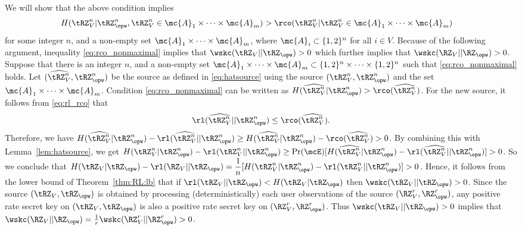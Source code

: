  
 We will show that the above condition implies 
  \begin{align} \label{eq:rco_nonmaximal}
     &H(\tRZ^n_V|\tRZ^n_{\opw},\tRZ^n_V\in \mc{A}_{1}\times\cdots\times\mc{A}_{m})
     > \rco(\tRZ^n_V|\tRZ^n_V\in \mc{A}_{1}\times\cdots\times\mc{A}_{m})
 \end{align}
 for some integer $n$, and a non-empty set $\mc{A}_{1}\times\cdots\times\mc{A}_{m}$, where $\mc{A}_{i} \subset \{1,2\}^n$ for all $i \in V$. Because of the following argument, inequality \eqref{eq:rco_nonmaximal} implies that $\wskc(\tRZ_V||\tRZ_{\opw})>0$ which further implies that $\wskc(\RZ_V||\RZ_{\opw})>0$. Suppose that there is an integer $n$, and a non-empty set $\mc{A}_{1}\times\cdots\times\mc{A}_{m}\subset \{1,2\}^n\times\cdots\times \{1,2\}^n$ such that \eqref{eq:rco_nonmaximal} holds. Let $(\widehat{\tRZ_V^n},\tRZ^n_{\opw})$ be the source as defined in \eqref{eq:hatsource} using the source $(\tRZ_V^n,\tRZ^n_{\opw})$ and the set $\mc{A}_{1}\times\cdots\times\mc{A}_{m}$.  Condition \eqref{eq:rco_nonmaximal} can be written as $H(\widehat{\tRZ_V^n}|\tRZ^n_{\opw})> \rco(\widehat{\tRZ_V^n})$. For the new source, it follows from \eqref{eq:rl_rco} that 
 \begin{align*}
     \rl(\widehat{\tRZ_V^n}||\tRZ^n_{\opw}) \leq \rco(\widehat{\tRZ_V^n}).
 \end{align*}
Therefore, we have  $H(\widehat{\tRZ_V^n}|\tRZ^n_{\opw})-\rl(\widehat{\tRZ_V^n}||\tRZ^n_{\opw}) \geq H(\widehat{\tRZ_V^n}|\tRZ^n_{\opw})- \rco(\widehat{\tRZ_V^n})>0$. By combining this with Lemma~\ref{lem:hatsource}, we get 
$H(\tRZ_V^n|\tRZ^n_{\opw})-\rl(\tRZ_V^n||\tRZ^n_{\opw}) \geq \Pr(\mcE) [H(\widehat{\tRZ_V^n}|\tRZ^n_{\opw})-\rl(\widehat{\tRZ_V^n}||\tRZ^n_{\opw})]>0$. So we conclude that $H(\tRZ_V|\tRZ_{\opw})-\rl(\RZ_V||\tRZ_{\opw})=\dfrac{1}{n}[H(\tRZ_V^n|\tRZ^n_{\opw})-\rl(\tRZ_V^n||\tRZ^n_{\opw})]>0$. Hence, it follows from the lower bound of Theorem~\ref{thm:RL:lb} that if $\rl(\tRZ_V||\tRZ_{\opw})< H(\tRZ_V|\tRZ_{\opw})$ then $\wskc(\tRZ_V||\tRZ_{\opw})>0$. Since the source $(\tRZ_V, \tRZ_{\opw})$ is obtained by processing (deterministically) each user observations of the source $(\RZ^r_V, \RZ^r_{\opw})$, any positive rate secret key on $(\tRZ_V, \tRZ_{\opw})$ is also a positive rate secret key on $(\RZ^r_V, \RZ^r_{\opw})$. Thus $\wskc(\tRZ_V||\tRZ_{\opw})>0$ implies that $\wskc(\RZ_V||\RZ_{\opw})= \frac{1}{r}\wskc(\RZ^r_V|| \RZ^r_{\opw})>0$.\\


